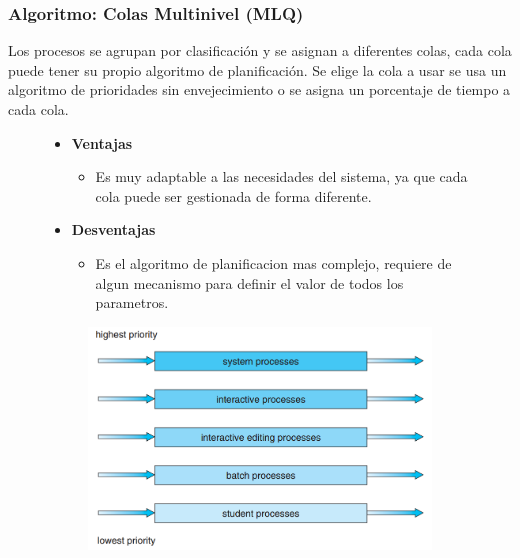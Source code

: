 \documentclass{beamer}
\newcommand{\algTitle}{\textbf{Algoritmo}: }
\begin{document}
\begin{frame}
\frametitle{\algTitle Colas Multinivel (MLQ)}

Los procesos se agrupan por clasificación y se asignan a diferentes colas,
cada cola puede tener su propio algoritmo de planificación.
Se elige la cola a usar se usa un algoritmo de prioridades sin envejecimiento o se asigna un
porcentaje de tiempo a cada cola.

\begin{figure}[h]
	\begin{minipage}{0.60\textwidth}
		\begin{itemize}
			\item \textbf{Ventajas}
			\begin{itemize}
				\item Es muy adaptable a las necesidades del sistema, ya que cada cola puede ser gestionada de
				forma diferente.
			\end{itemize}
			\vspace{0.2cm}
			
			\item \textbf{Desventajas}
			\begin{itemize}
				\item Es el algoritmo de planificacion mas complejo, requiere de algun mecanismo
				para definir el valor de todos los parametros.
			\end{itemize}
		\end{itemize}
	\end{minipage}\hfill
	\begin{minipage}{0.40\textwidth}
		\centering
		\begin{figure}
			\centering
			\includegraphics[width=1\textwidth]{img/mlq}
		\end{figure}
	\end{minipage}\hfill
\end{figure}
\end{frame}
\end{document}
